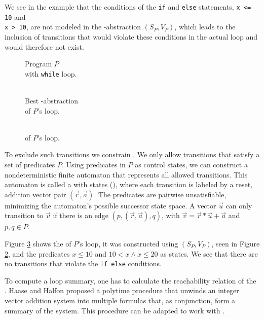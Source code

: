 We see in the example that the conditions of the \texttt{if} and \texttt{else} statements, \texttt{x <= 10} and \\ \texttt{x > 10}, are not modeled in the \qvasr-abstraction $(S_P, V_P)$, which leads to the inclusion of transitions that would violate these conditions in the actual loop and would therefore not exist. \\
\begin{minipage}[t]{0.3\linewidth} \centering
	\begin{figure}[H]
		
		\caption{Program $P$ \\ with \texttt{while} loop.}
		\label{code}
	\end{figure}
\end{minipage}
\begin{minipage}[t]{0.35\linewidth} \centering
	\begin{figure}[H]
			
			\caption{\\ Best \qvasr-abstraction \\ of $P$'s loop.}
			\label{vasr}
	\end{figure}
\end{minipage}
\begin{minipage}[t]{0.3\linewidth} \centering
	\begin{figure}[H]
		
		\caption{\\ \qvasrs of $P$'s loop.}
		\label{vasrs}
	\end{figure}
\end{minipage}
\vspace*{1cm}
\pagebreak

To exclude such transitions we constrain \qvasr. We only allow transitions that satisfy a set of predicates $P$. Using predicates in $P$ as control states, we can construct a nondeterministic finite automaton that represents all allowed transitions. This automaton is called a \qvasr with states (\qvasrs), where each transition is labeled by a reset, addition vector pair $(\vec{r}, \vec{a})$. The predicates are pairwise unsatisfiable, minimizing the automaton's possible successor state space. A vector $\vec{u}$ can only transition to $\vec{v}$ if there is an edge $(p, (\vec{r}, \vec{a}), q)$, with $\vec{v} = \vec{r} * \vec{u} + \vec{a}$ and $p, q \in P$. \par
Figure \ref{vasrs} shows the \qvasrs of $P$'s loop, it was constructed using $(S_P, V_P)$, seen in Figure \ref{vasr}, and the predicates $x \leq 10$ and $10 < x \land x \leq 20$ as states. We see that there are no transitions that violate the \texttt{if else} conditions. \par
To compute a loop summary, one has to calculate the reachability relation of the \qvasrs. Haase and Halfon \cite{DBLP:conf/rp/HaaseH14} proposed a polytime procedure that unwinds an integer vector addition system into multiple formulas that, as conjunction, form a summary of the system. This procedure can be adapted to work with \qvasrs. \\ \par

